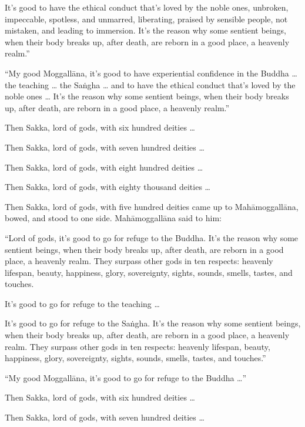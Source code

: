 \documentclass[12pt,openany]{book}%
\begin{document}
It’s good to have the ethical conduct that’s loved by the noble ones, unbroken, impeccable, spotless, and unmarred, liberating, praised by sensible people, not mistaken, and leading to immersion. It’s the reason why some sentient beings, when their body breaks up, after death, are reborn in a good place, a heavenly realm.” 

“My good \textsanskrit{Moggallāna}, it’s good to have experiential confidence in the Buddha … the teaching … the \textsanskrit{Saṅgha} … and to have the ethical conduct that’s loved by the noble ones … It’s the reason why some sentient beings, when their body breaks up, after death, are reborn in a good place, a heavenly realm.” 

Then Sakka, lord of gods, with six hundred deities … 

Then Sakka, lord of gods, with seven hundred deities … 

Then Sakka, lord of gods, with eight hundred deities … 

Then Sakka, lord of gods, with eighty thousand deities … 

Then Sakka, lord of gods, with five hundred deities came up to \textsanskrit{Mahāmoggallāna}, bowed, and stood to one side. \textsanskrit{Mahāmoggallāna} said to him: 

“Lord of gods, it’s good to go for refuge to the Buddha. It’s the reason why some sentient beings, when their body breaks up, after death, are reborn in a good place, a heavenly realm. They surpass other gods in ten respects: heavenly lifespan, beauty, happiness, glory, sovereignty, sights, sounds, smells, tastes, and touches. 

It’s good to go for refuge to the teaching … 

It’s good to go for refuge to the \textsanskrit{Saṅgha}. It’s the reason why some sentient beings, when their body breaks up, after death, are reborn in a good place, a heavenly realm. They surpass other gods in ten respects: heavenly lifespan, beauty, happiness, glory, sovereignty, sights, sounds, smells, tastes, and touches.” 

“My good \textsanskrit{Moggallāna}, it’s good to go for refuge to the Buddha …” 

Then Sakka, lord of gods, with six hundred deities … 

Then Sakka, lord of gods, with seven hundred deities … 
\end{document}
